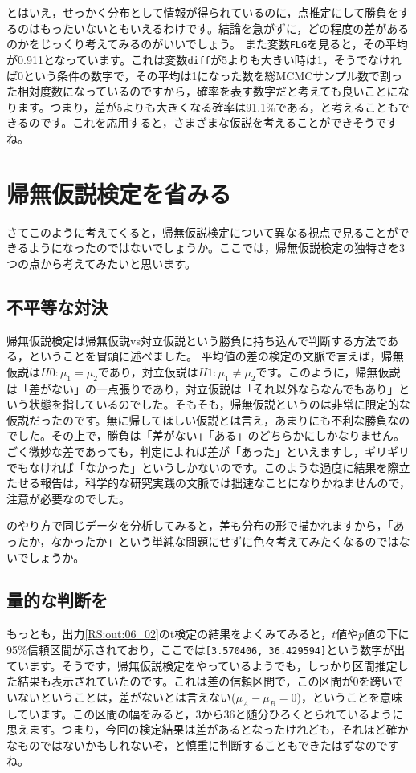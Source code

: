 \documentclass{ltjsbook}
\begin{document}
とはいえ，せっかく分布として情報が得られているのに，点推定にして勝負をするのはもったいないともいえるわけです。結論を急がずに，どの程度の差があるのかをじっくり考えてみるのがいいでしょう。
また変数\verb|FLG|を見ると，その平均が0.911となっています。これは変数\verb|diff|が5よりも大きい時は1，そうでなければ0という条件の数字で，その平均は1になった数を総MCMCサンプル数で割った相対度数になっているのですから，確率を表す数字だと考えても良いことになります。つまり，差が5よりも大きくなる確率は91.1\%である，と考えることもできるのです。これを応用すると，さまざまな仮説を考えることができそうですね。

\section{帰無仮説検定を省みる}
さてこのように考えてくると，帰無仮説検定について異なる視点で見ることができるようになったのではないでしょうか。ここでは，帰無仮説検定の独特さを3つの点から考えてみたいと思います。
\subsection{不平等な対決}
帰無仮説検定は帰無仮説vs対立仮説という勝負に持ち込んで判断する方法である，ということを冒頭に述べました。
平均値の差の検定の文脈で言えば，帰無仮説は$H0:\mu_1=\mu_2$であり，対立仮説は$H1:\mu_1\neq\mu_2$です。このように，帰無仮説は「差がない」の一点張りであり，対立仮説は「それ以外ならなんでもあり」という状態を指しているのでした。そもそも，帰無仮説というのは非常に限定的な仮説だったのです。無に帰してほしい仮説とは言え，あまりにも不利な勝負なのでした。その上で，勝負は「差がない」「ある」のどちらかにしかなりません。ごく微妙な差であっても，判定によれば差が「あった」といえますし，ギリギリでもなければ「なかった」というしかないのです。このような過度に結果を際立たせる報告は，科学的な研究実践の文脈では拙速なことになりかねませんので，注意が必要なのでした。

のやり方で同じデータを分析してみると，差も分布の形で描かれますから，「あったか，なかったか」という単純な問題にせずに色々考えてみたくなるのではないでしょうか。
\subsection{量的な判断を}
もっとも，出力\ref{RS:out:06_02}のt検定の結果をよくみてみると，$t$値や$p$値の下に95\%信頼区間が示されており，ここでは\verb|[3.570406, 36.429594]|という数字が出ています。そうです，帰無仮説検定をやっているようでも，しっかり区間推定した結果も表示されていたのです。これは差の信頼区間で，この区間が0を跨いでいないということは，差がないとは言えない($\mu_A-\mu_B=0$)，ということを意味しています。この区間の幅をみると，3から36と随分ひろくとられているように思えます。つまり，今回の検定結果は差があるとなったけれども，それほど確かなものではないかもしれないぞ，と慎重に判断することもできたはずなのですね。
\end{document}
